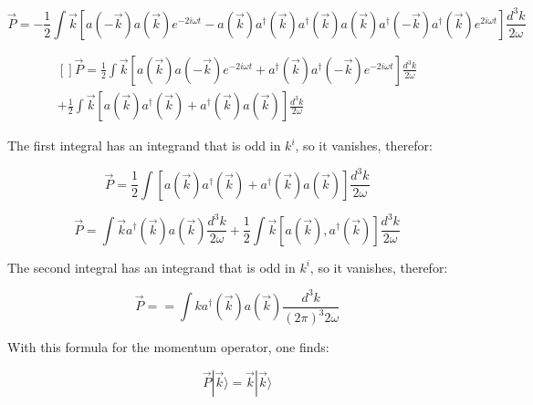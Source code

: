 \documentclass{article}
\begin{document}
    \begin{equation}
        \vec{P} = - \frac{1}{2} \int \vec{k} [a (-\vec{k}) a (\vec{k}) e^{-2 i \omega t} - a (\vec{k}) a^{\dag} (\vec{k}) a^{\dag} (\vec{k}) a (\vec{k}) a^{\dag} (-\vec{k}) a^{\dag} (\vec{k}) e^{2 i \omega t}] \frac{d^3k}{2 \omega}
    \end{equation}

    \begin{equation}
        \begin{aligned}[]
            \vec{P} = \frac{1}{2} \int \vec{k} [a (\vec{k}) a (-\vec{k}) e^{- 2 i \omega t} + a^{\dag} (\vec{k}) a^{\dag} (-\vec{k}) e^{- 2 i \omega t}] \frac{d^3k}{2 \omega} \\
            + \frac{1}{2} \int \vec{k} [a (\vec{k}) a^{\dag} (\vec{k}) + a^{\dag} (\vec{k}) a (\vec{k})] \frac{d^3k}{2 \omega}
        \end{aligned}
    \end{equation}

    The first integral has an integrand that is odd in $k^i$, so it vanishes, therefor:

    \begin{equation}
        \vec{P} = \frac{1}{2} \int [a (\vec{k}) a^{\dag} (\vec{k}) + a^{\dag} (\vec{k}) a (\vec{k})] \frac{d^3k}{2 \omega}
    \end{equation}

    \begin{equation}
        \vec{P} = \int \vec{k} a^{\dag} (\vec{k}) a (\vec{k}) \frac{d^3k}{2 \omega} + \frac{1}{2} \int \vec{k} [a (\vec{k}), a^{\dag} (\vec{k})] \frac{d^3k}{2 \omega}
    \end{equation}

    The second integral has an integrand that is odd in $k^i$, so it vanishes, therefor:

    \begin{framed}
        \begin{equation}
                \vec{P} = = \int k a^{\dag}(\vec{k}) a(\vec{k}) \frac{d^{3} k}{(2 \pi)^{3} 2 \omega}
        \end{equation}
    \end{framed}

    With this formula for the momentum operator, one finds:

    \begin{equation}
        \vec{P} | \vec{k} \rangle = \vec{k} | \vec{k} \rangle
    \end{equation}
\end{document}
